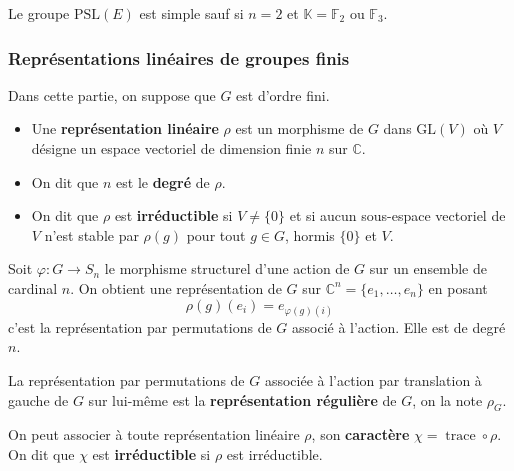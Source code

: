   \begin{theorem}
    Le groupe $\mathrm{PSL}(E)$ est simple sauf si $n = 2$ et $\mathbb{K} = \mathbb{F}_2$ ou $\mathbb{F}_3$.
  \end{theorem}

  \subsubsection{Représentations linéaires de groupes finis}


  Dans cette partie, on suppose que $G$ est d'ordre fini.

  \begin{definition}
    \begin{itemize}
      \item Une \textbf{représentation linéaire} $\rho$ est un morphisme de $G$ dans $\mathrm{GL}(V)$ où $V$ désigne un espace vectoriel de dimension finie $n$ sur $\mathbb{C}$.
      \item On dit que $n$ est le \textbf{degré} de $\rho$.
      \item On dit que $\rho$ est \textbf{irréductible} si $V \neq \{ 0 \}$ et si aucun sous-espace vectoriel de $V$ n'est stable par $\rho(g)$ pour tout $g \in G$, hormis $\{ 0 \}$ et $V$.
    \end{itemize}
  \end{definition}

  \begin{example}
    Soit $\varphi : G \rightarrow S_n$ le morphisme structurel d'une action de $G$ sur un ensemble de cardinal $n$. On obtient une représentation de $G$ sur $\mathbb{C}^n = \{ e_1, \dots, e_n \}$ en posant
    \[ \rho(g)(e_i) = e_{\varphi(g)(i)} \]
    c'est la représentation par permutations de $G$ associé à l'action. Elle est de degré $n$.
  \end{example}

  \begin{definition}
    La représentation par permutations de $G$ associée à l'action par translation à gauche de $G$ sur lui-même est la \textbf{représentation régulière} de $G$, on la note $\rho_G$.
  \end{definition}


  \begin{definition}
    On peut associer à toute représentation linéaire $\rho$, son \textbf{caractère} $\chi = \operatorname{trace} \circ \rho$. On dit que $\chi$ est \textbf{irréductible} si $\rho$ est irréductible.
  \end{definition}

